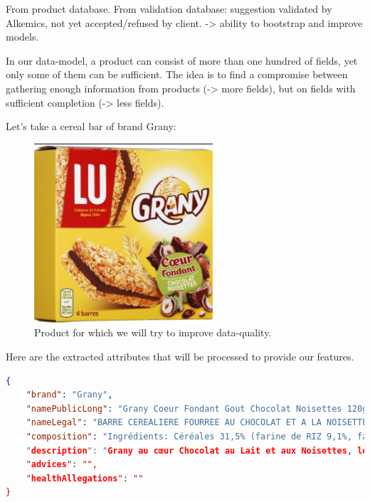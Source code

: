 From product database.
From validation database: suggestion validated by Alkemics, not yet accepted/refused by client. -> ability to bootstrap and improve models. 


In our data-model, a product can consist of more than one hundred of fields, yet only some of them can be sufficient.
The idea is to find a compromise between gathering enough information from products (-> more fields), but on fields with sufficient completion (-> less fields).

Let's take a cereal bar of brand Grany:
\begin{figure}[H]
\centering
\includegraphics[scale=0.50]{./images/sample/grany_picture.png}
\caption{Product for which we will try to improve data-quality.}
\end{figure}

Here are the extracted attributes that will be processed to provide our features.

\begin{lstlisting}[language=json]
{
    "brand": "Grany",
    "namePublicLong": "Grany Coeur Fondant Gout Chocolat Noisettes 120g",
    "nameLegal": "BARRE CEREALIERE FOURREE AU CHOCOLAT ET A LA NOISETTE.",
    "composition": "Ingrédients: Céréales 31,5% (farine de RIZ 9,1%, farine de BLÉ 5,6%, grains de maïs 4,7%, flocons de BLÉ 4,5%, flocons d'AVOINE 4,5%, flocons d'ORGE 2,5%, farine de BLÉ malté 0,6%), sirop de glucose-fructose, sucre, huile de coprah, LAIT écrémé en poudre, huile de palme, chocolat 5% (sucre, pâte de cacao), pâte de NOISETTES 5%, cacao maigre en poudre, humectant (glycérol), sel, gluten (de BLÉ), dextrose, émulsifiant (lécithine de tournesol), malt d'ORGE, arôme (NOISETTES), ARACHIDE. PEUT CONTENIR SOJA, AUTRES FRUITS À COQUE.',
    "description": "Grany au cœur Chocolat au Lait et aux Noisettes, le plaisir brut des céréales associées au fondant du chocolat au lait !",
    "advices": "",
    "healthAllegations": ""
}
\end{lstlisting}

